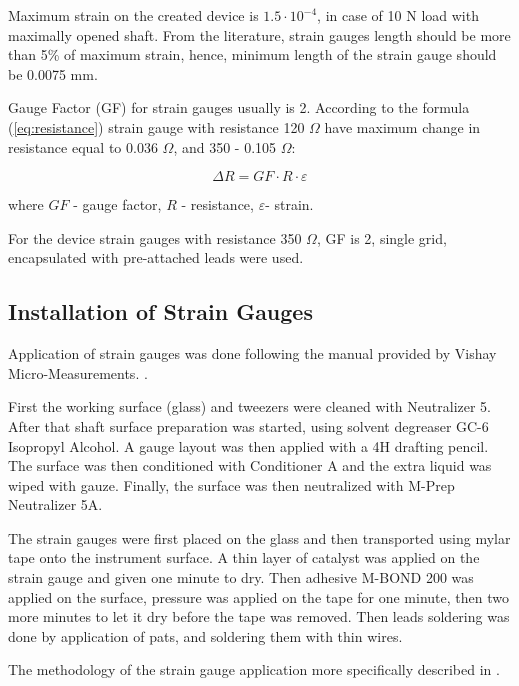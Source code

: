 Maximum strain on the created device is $1.5 \cdot 10^{-4}$, in case of 10 N load with maximally opened shaft. From the literature, strain gauges length should be more than 5\% of maximum strain, hence, minimum length of the strain gauge should be 0.0075 mm. 

Gauge Factor (GF) for strain gauges usually is 2. According to the formula (\ref{eq:resistance}) strain gauge with resistance 120 $\Omega$ have maximum change in resistance equal to 0.036 $\Omega$, and 350  - 0.105 $\Omega$:

\begin{equation}\label{eq:resistance}
\Delta R=GF \cdot R \cdot \varepsilon
\end{equation}

where $GF$ - gauge factor, $R$ - resistance, $\varepsilon$- strain.

For the device strain gauges with resistance 350 $\Omega$, GF is 2, single grid, encapsulated with pre-attached leads were used.

	\subsection{Installation of Strain Gauges}
	\label{sec:instSG}

	Application of strain gauges was done following the manual provided by Vishay Micro-Measurements. \cite{StrGugeInst}.

	First the working surface (glass) and tweezers were cleaned with Neutralizer 5. 
	After that shaft surface preparation was started, using solvent degreaser GC-6 Isopropyl Alcohol. 
	A gauge layout was then applied with a 4H drafting pencil. The surface was then conditioned with Conditioner A and the extra liquid was wiped with gauze. 
	Finally, the surface was then neutralized with M-Prep Neutralizer 5A. \cite{StrGugeInst}

	The strain gauges were first placed on the glass and then transported using mylar tape onto the instrument surface. A thin layer of catalyst was applied on the strain gauge and given one minute to dry. Then adhesive M-BOND 200 was applied on the surface, pressure was applied on the tape for one minute, then two more minutes to let it dry before the tape was removed. Then leads soldering was done by application of pats, and soldering them with thin wires. \cite{youtube}

	The methodology of the strain gauge application more specifically described in \cite{StrGugeInst}.

